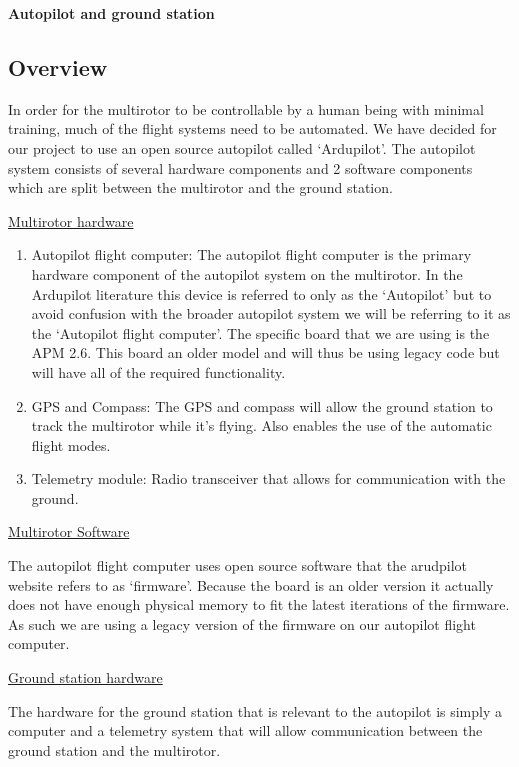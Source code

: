 \textbf{Autopilot and ground station}

\subsection{Overview}

In order for the multirotor to be controllable by a human being with minimal training, much of the flight systems need to be automated. We have decided for our project to use an open source autopilot called ‘Ardupilot’. The autopilot system consists of several hardware components and 2 software components which are split between the multirotor and the ground station.

\underline{Multirotor hardware}\

\begin{enumerate}

    \item Autopilot flight computer: The autopilot flight computer is the primary hardware component of the autopilot system on the multirotor. In the Ardupilot literature this device is referred to only as the ‘Autopilot’ but to avoid confusion with the broader autopilot system we will be referring to it as the ‘Autopilot flight computer’. The specific board that we are using is the APM 2.6. This board an older model and will thus be using legacy code but will have all of the required functionality.
  
  \item GPS and Compass: The GPS and compass will allow the ground station to track the multirotor while it’s flying. Also enables the use of the automatic flight modes.
 
 \item Telemetry module: Radio transceiver that allows for communication with the ground.
 
\end{enumerate}

\underline{Multirotor Software}

The autopilot flight computer uses open source software that the arudpilot website refers to as ‘firmware’. Because the board is an older version it actually does not have enough physical memory to fit the latest iterations of the firmware. As such we are using a legacy version of the firmware on our autopilot flight computer.

\underline{Ground station hardware}

The hardware for the ground station that is relevant to the autopilot is simply a computer and a telemetry system that will allow communication between the ground station and the multirotor.

